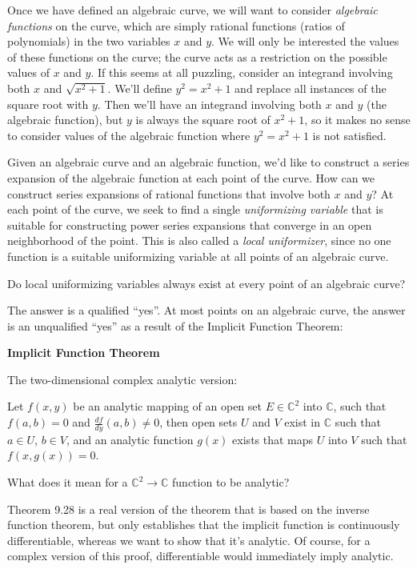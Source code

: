 Once we have defined an algebraic curve, we will want to consider
{\it algebraic functions} on the curve, which are simply rational
functions (ratios of polynomials) in the two variables $x$ and $y$.
We will only be interested the values of these functions on the
curve; the curve acts as a restriction on the possible values
of $x$ and $y$.  If this seems at all puzzling, consider an integrand involving both $x$ and $\sqrt{x^2+1}$.
We'll define $y^2 = x^2+1$ and replace all instances of the square root
with $y$.  Then we'll have an integrand involving both $x$ and $y$ (the algebraic function),
but $y$ is always the square root of $x^2+1$, so it makes no sense to consider values of the algebraic
function where $y^2 = x^2+1$ is not satisfied.

Given an algebraic curve and an algebraic function, we'd like to construct a series expansion
of the algebraic function at each point of the curve.
How can we construct series expansions of rational
functions that involve both $x$ and $y$?  At each point of the
curve, we seek to find a single {\it uniformizing variable} that is
suitable for constructing power series expansions that converge in
an open neighborhood of the point.  This is also
called a {\it local uniformizer}, since no one function is a suitable
uniformizing variable at all points of an algebraic curve.


Do local uniformizing variables always exist at every point of an algebraic curve?

The answer is a qualified ``yes''.  At most points on an algebraic
curve, the answer is an unqualified ``yes'' as a result of the
Implicit Function Theorem:

\theorem
{\bf Implicit Function Theorem}
\label{implicit function theorem}

The two-dimensional complex analytic version:

Let $f(x,y)$ be an analytic
mapping of an open set $E \in {\mathbb C}^2$ into ${\mathbb C}$, such
that $f(a,b)=0$ and $\frac{df}{dy}(a,b) \ne 0$, then open sets $U$ and $V$
exist in ${\mathbb C}$ such that $a \in U$, $b \in V$, and
an analytic function $g(x)$ exists that maps $U$ into $V$ such that $f(x,g(x))=0$.

What does it mean for a ${\mathbb C}^2 \to {\mathbb C}$ function
to be analytic?

\cite{baby rudin} Theorem 9.28 is a real version of the theorem
that is based on the inverse function theorem, but only
establishes that the implicit function is continuously differentiable,
whereas we want to show that it's analytic.  Of course, for a complex
version of this proof, differentiable would immediately imply analytic.

